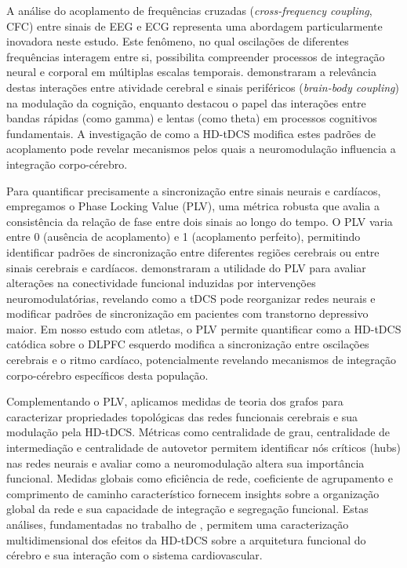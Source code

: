 A análise do acoplamento de frequências cruzadas (\textit{cross-frequency coupling}, CFC) entre sinais de EEG e ECG representa uma abordagem particularmente inovadora neste estudo. Este fenômeno, no qual oscilações de diferentes frequências interagem entre si, possibilita compreender processos de integração neural e corporal em múltiplas escalas temporais.  demonstraram a relevância destas interações entre atividade cerebral e sinais periféricos (\textit{brain-body coupling}) na modulação da cognição, enquanto  destacou o papel das interações entre bandas rápidas (como gamma) e lentas (como theta) em processos cognitivos fundamentais. A investigação de como a HD-tDCS modifica estes padrões de acoplamento pode revelar mecanismos pelos quais a neuromodulação influencia a integração corpo-cérebro.

Para quantificar precisamente a sincronização entre sinais neurais e cardíacos, empregamos o Phase Locking Value (PLV), uma métrica robusta que avalia a consistência da relação de fase entre dois sinais ao longo do tempo. O PLV varia entre 0 (ausência de acoplamento) e 1 (acoplamento perfeito), permitindo identificar padrões de sincronização entre diferentes regiões cerebrais ou entre sinais cerebrais e cardíacos.  demonstraram a utilidade do PLV para avaliar alterações na conectividade funcional induzidas por intervenções neuromodulatórias, revelando como a tDCS pode reorganizar redes neurais e modificar padrões de sincronização em pacientes com transtorno depressivo maior. Em nosso estudo com atletas, o PLV permite quantificar como a HD-tDCS catódica sobre o DLPFC esquerdo modifica a sincronização entre oscilações cerebrais e o ritmo cardíaco, potencialmente revelando mecanismos de integração corpo-cérebro específicos desta população.

Complementando o PLV, aplicamos medidas de teoria dos grafos para caracterizar propriedades topológicas das redes funcionais cerebrais e sua modulação pela HD-tDCS. Métricas como centralidade de grau, centralidade de intermediação e centralidade de autovetor permitem identificar nós críticos (hubs) nas redes neurais e avaliar como a neuromodulação altera sua importância funcional. Medidas globais como eficiência de rede, coeficiente de agrupamento e comprimento de caminho característico fornecem insights sobre a organização global da rede e sua capacidade de integração e segregação funcional. Estas análises, fundamentadas no trabalho de , permitem uma caracterização multidimensional dos efeitos da HD-tDCS sobre a arquitetura funcional do cérebro e sua interação com o sistema cardiovascular.

